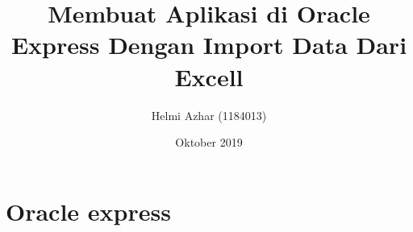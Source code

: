 ﻿\documentclass{article}
\title{Membuat Aplikasi di Oracle Express Dengan Import Data Dari Excell}
\author{Helmi Azhar (1184013) }
\date{Oktober 2019}
\begin{document}
\maketitle

\section{Oracle express}
\begin{enumerate}
\usepackage{Oracle Apex merupakan suatu aplikasi atau tools  untuk memudahkan apa yang kita butuhkan. Sesuai namanya, oracle express bila dipelajari lebih dalam banyak memberi kemudahan dalam melayanani kebutuhan user contohnya dalam pembuatan aplikasi sederhana,belajar function dan lain-lain. Oracle apex juga dapat mengembangkan aplikasi web desktop dan seluler, memvisualisasikan dan memelihara data basis data, dan meningkatkan keterampilan sql dan kemampuan basis data}
\end{enumerate}

\begin{enumerate}
    \usepackage{pada tugas kali ini saya akan membuat aplikasi di oracle express dengan menginput data dari excell. sebagai contoh saya mengambil 50 data mahasiswa}
\end{enumerate}
\end{document}
